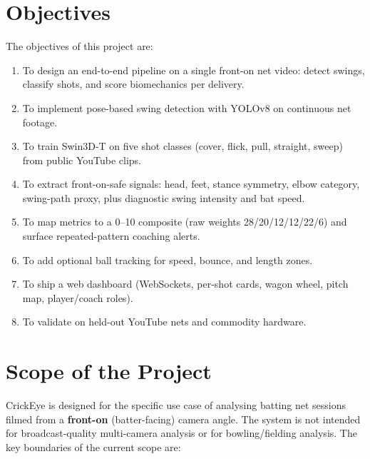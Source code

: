 \begin{justify}
\section{Objectives}

\par The objectives of this project are:

\begin{enumerate}
    \item To design an end-to-end pipeline on a single front-on net video: detect swings, classify shots, and score biomechanics per delivery.
    \item To implement pose-based swing detection with YOLOv8 on continuous net footage.
    \item To train Swin3D-T on five shot classes (cover, flick, pull, straight, sweep) from public YouTube clips.
    \item To extract front-on-safe signals: head, feet, stance symmetry, elbow category, swing-path proxy, plus diagnostic swing intensity and bat speed.
    \item To map metrics to a 0--10 composite (raw weights 28/20/12/12/22/6) and surface repeated-pattern coaching alerts.
    \item To add optional ball tracking for speed, bounce, and length zones.
    \item To ship a web dashboard (WebSockets, per-shot cards, wagon wheel, pitch map, player/coach roles).
    \item To validate on held-out YouTube nets and commodity hardware.
\end{enumerate}

\section{Scope of the Project}

\par CrickEye is designed for the specific use case of analysing batting net sessions filmed from a \textbf{front-on} (batter-facing) camera angle. The system is not intended for broadcast-quality multi-camera analysis or for bowling/fielding analysis. The key boundaries of the current scope are:


\end{justify}

